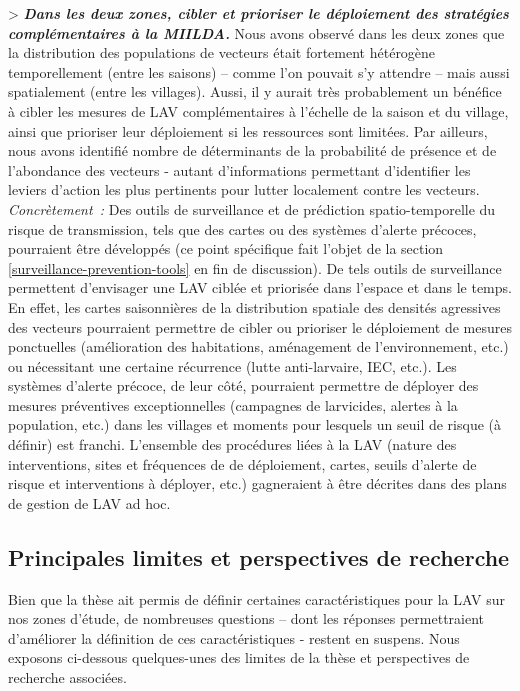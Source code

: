 \documentclass[12pt,twoside]{reedthesis}
\begin{document}
\textgreater{} \textbf{\emph{Dans les deux zones, cibler et prioriser le déploiement des stratégies complémentaires à la MIILDA.}} Nous avons observé dans les deux zones que la distribution des populations de vecteurs était fortement hétérogène temporellement (entre les saisons) -- comme l'on pouvait s'y attendre -- mais aussi spatialement (entre les villages). Aussi, il y aurait très probablement un bénéfice à cibler les mesures de LAV complémentaires à l'échelle de la saison et du village, ainsi que prioriser leur déploiement si les ressources sont limitées. Par ailleurs, nous avons identifié nombre de déterminants de la probabilité de présence et de l'abondance des vecteurs - autant d'informations permettant d'identifier les leviers d'action les plus pertinents pour lutter localement contre les vecteurs.\\

\emph{Concrètement~:} Des outils de surveillance et de prédiction spatio-temporelle du risque de transmission, tels que des cartes ou des systèmes d'alerte précoces, pourraient être développés (ce point spécifique fait l'objet de la section \ref{surveillance-prevention-tools} en fin de discussion). De tels outils de surveillance permettent d'envisager une LAV ciblée et priorisée dans l'espace et dans le temps. En effet, les cartes saisonnières de la distribution spatiale des densités agressives des vecteurs pourraient permettre de cibler ou prioriser le déploiement de mesures ponctuelles (amélioration des habitations, aménagement de l'environnement, etc.) ou nécessitant une certaine récurrence (lutte anti-larvaire, IEC, etc.). Les systèmes d'alerte précoce, de leur côté, pourraient permettre de déployer des mesures préventives exceptionnelles (campagnes de larvicides, alertes à la population, etc.) dans les villages et moments pour lesquels un seuil de risque (à définir) est franchi. L'ensemble des procédures liées à la LAV (nature des interventions, sites et fréquences de de déploiement, cartes, seuils d'alerte de risque et interventions à déployer, etc.) gagneraient à être décrites dans des plans de gestion de LAV ad hoc.

\hypertarget{principales-limites-et-perspectives-de-recherche}{%
\subsection{Principales limites et perspectives de recherche}\label{principales-limites-et-perspectives-de-recherche}}

Bien que la thèse ait permis de définir certaines caractéristiques pour la LAV sur nos zones d'étude, de nombreuses questions -- dont les réponses permettraient d'améliorer la définition de ces caractéristiques - restent en suspens. Nous exposons ci-dessous quelques-unes des limites de la thèse et perspectives de recherche associées.\\
\end{document}
